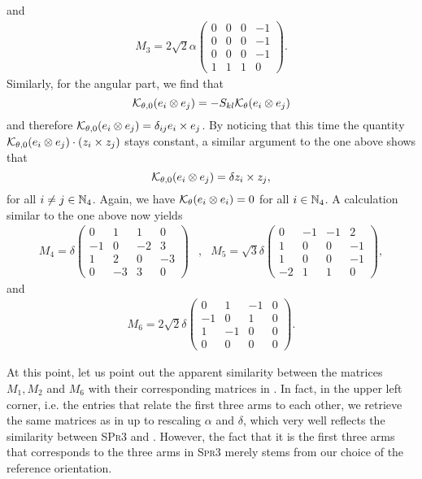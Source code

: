 and
\begin{align}
\label{eq: M3}
M_3 = 2 \sqrt{2} \alpha \left (
\begin{array}{cccc}
0 & 0 & 0 & -1 \\ 
0 & 0 & 0 & -1 \\ 
0 & 0 & 0 & -1 \\ 
1 & 1 & 1 & 0
\end{array} 
\right ).
\end{align}
Similarly, for the angular part, we find that
\begin{equation}
	\mathcal{K}_{\theta, 0}(e_i \otimes e_j) = - S_{kl} \mathcal{K}_{\theta}(e_i \otimes e_j)
\end{equation}
and therefore $\mathcal{K}_{\theta,0}(e_i \otimes e_j) = \delta_{ij} e_i \times e_j$. By noticing that this time the quantity $\mathcal{K}_{\theta,0}(e_i \otimes e_j) \cdot (z_i \times z_j)$ stays constant, a similar argument to the one above shows that
\begin{equation}
\mathcal{K}_{\theta,0}(e_i \otimes e_j) = \delta z_i \times z_j,
\end{equation}
for all $i \neq j \in \mathbb{N}_4$. Again, we have $\mathcal{K}_{\theta}(e_i \otimes e_i) = 0$ for all $i \in \mathbb{N}_4$. A calculation similar to the one above now yields
\begin{align}
\label{eq: M4 and M5}
	M_4 = \delta \left (
	\begin{array}{cccc}
	0 & 1 & 1 & 0 \\ 
	-1 & 0 & -2 & 3 \\ 
	1 & 2 & 0 & -3 \\ 
	0 & -3 & 3 & 0
	\end{array} 
	\right ) &, & M_5 = \sqrt{3} \delta \left ( \begin{array}{cccc}
	0 & -1 & -1 & 2 \\ 
	1 & 0 & 0 & -1 \\ 
	1 & 0 & 0 & -1 \\ 
	-2 & 1 & 1 & 0
	\end{array} \right ) ,
\end{align}
and
\begin{align}
\label{eq: M6}
M_6 = 2 \sqrt{2} \delta \left (\begin{array}{cccc}
0 & 1 & -1 & 0 \\ 
-1 & 0 & 1 & 0 \\ 
1 & -1 & 0 & 0 \\ 
0 & 0 & 0 & 0
\end{array}  \right ).
\end{align}

\begin{remark}
At this point, let us point out the apparent similarity between the matrices $M_1, M_2$ and $M_6$ with their corresponding matrices in \cite{Alouges2017}. In fact, in the upper left corner, i.e. the entries that relate the first three arms to each other, we retrieve the same matrices as in \cite{Alouges2017} up to rescaling $\alpha$ and $\delta$, which very well reflects the similarity between \textsc{SPr3} and \spr. However, the fact that it is the first three arms that corresponds to the three arms in \textsc{Spr3} merely stems from our choice of the reference orientation.
\end{remark}

